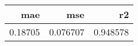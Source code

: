 \begin{tabular}{rrr}
\toprule
    mae &      mse &       r2 \\
\midrule
0.18705 & 0.076707 & 0.948578 \\
\bottomrule
\end{tabular}
